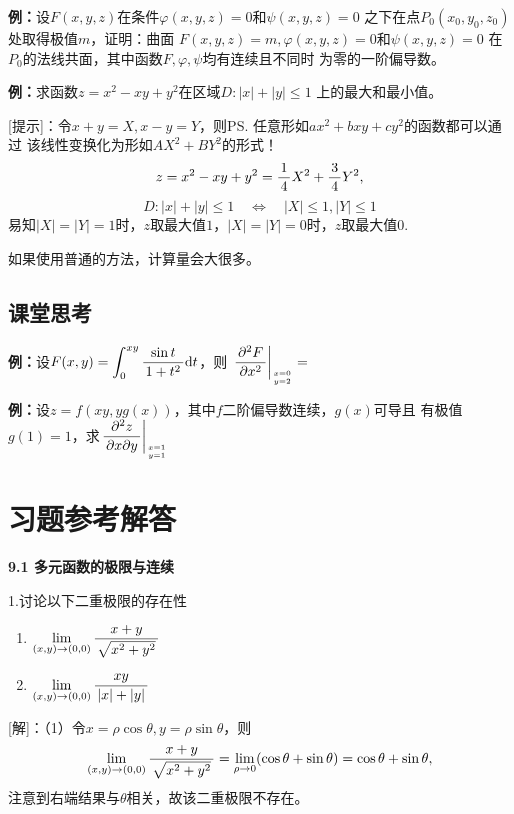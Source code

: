 {\bf 例：}设$F(x,y,z)$在条件$\varphi(x,y,z)=0$和$\psi(x,y,z)=0$
之下在点$P_0(x_0,y_0,z_0)$处取得极值$m$，证明：曲面
$F(x,y,z)=m,\varphi(x,y,z)=0$和$\psi(x,y,z)=0$
在$P_0$的法线共面，其中函数$F,\varphi,\psi$均有连续且不同时
为零的一阶偏导数。

{\bf 例：}求函数$z=x^2-xy+y^2$在区域$D:|x|+|y|\leq 1$
上的最大和最小值。

[提示]：令$x+y=X,x-y=Y$，则\ps{任意形如$ax^2+bxy+cy^2$的函数都可以通过
该线性变换化为形如$AX^2+BY^2$的形式！}
$$z=x^2-xy+y^2=\displaystyle\frac{\,{1}\,}{\,{4}\,}X^2+\displaystyle\frac{\,{3}\,}{\,{4}\,}Y^2,$$
$$D:|x|+|y|\leq 1\quad\Leftrightarrow\quad |X|\leq1,|Y|\leq1$$
易知$|X|=|Y|=1$时，$z$取最大值$1$，$|X|=|Y|=0$时，$z$取最大值$0$.

如果使用普通的方法，计算量会大很多。

\subsection*{课堂思考}

{\bf 例：}设$F(x,y)=\displaystyle\int_0^{xy}\displaystyle\frac{\,{\sin t}\,}{\,{1+t^2}\,}\mathrm{d} t$，则
$\left.\displaystyle\frac{\,{\partial^2F}\,}{\,{\partial x^2}\,}\right|_{x=0 \atop y=2}=$
\underline{\quad\quad\quad}

{\bf 例：}设$z=f(xy,yg(x))$，其中$f$二阶偏导数连续，$g(x)$可导且
有极值$g(1)=1$，求$\left.\displaystyle\frac{\,{\partial^2z}\,}{\,{\partial x\partial y}\,}\right|_{x=1\atop y=1}$

\section*{习题参考解答}

\begin{center}
	\bf 9.1 多元函数的极限与连续
\end{center}

1.讨论以下二重极限的存在性
\begin{enumerate}[(1)]
  	\setlength{\itemindent}{1cm}
    \item $\lim\limits_{(x,y)\to(0,0)}\displaystyle\frac{\,{x+y}\,}{\,{\sqrt{x^2+y^2}}\,}$
    \item $\lim\limits_{(x,y)\to(0,0)}\displaystyle\frac{\,{xy}\,}{\,{|x|+|y|}\,}$
  \end{enumerate}

[解]：（1）令$x=\rho\cos\theta,y=\rho\sin\theta$，则
$$\lim\limits_{(x,y)\to(0,0)}\displaystyle\frac{\,{x+y}\,}{\,{\sqrt{x^2+y^2}}\,}
=\lim\limits_{\rho\to 0}(\cos\theta+\sin\theta)=\cos\theta+\sin\theta,$$
注意到右端结果与$\theta$相关，故该二重极限不存在。

